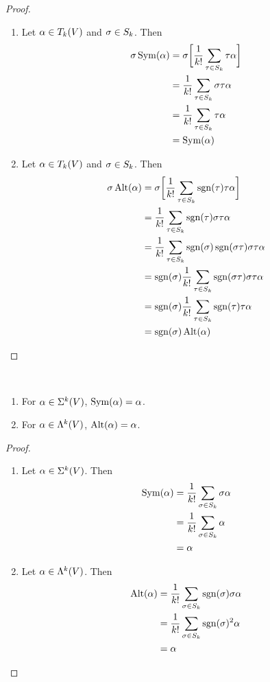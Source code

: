 \documentclass{book}
\begin{document}
	\begin{proof}\
		\begin{enumerate}
			\item Let $\alpha \in T_k(V)$ and $\sigma \in S_k$. Then 
			\begin{align*}
				\sigma \operatorname{Sym}(\alpha) 
				&= \sigma \bigg[ \frac{1}{k!}\sum_{\tau \in S_k} \tau \alpha \bigg]\\
				&= \frac{1}{k!} \sum_{\tau \in S_k} \sigma \tau \alpha \\
				&= \frac{1}{k!} \sum_{\tau \in S_k} \tau \alpha \\
				&= \operatorname{Sym}(\alpha)
			\end{align*} 
			\item Let $\alpha \in T_k(V)$ and $\sigma \in S_k$. Then 
			\begin{align*}
				\sigma \operatorname{Alt}(\alpha) 
				&= \sigma \bigg[ \frac{1}{k!}\sum_{\tau \in S_k} \operatorname{sgn}(\tau)\tau \alpha \bigg] \\
				&= \frac{1}{k!}\sum_{\tau \in S_k} \operatorname{sgn}(\tau) \sigma \tau \alpha \\
				&= \frac{1}{k!} \sum_{\tau \in S_k} \operatorname{sgn}(\sigma) \operatorname{sgn}(\sigma \tau) \sigma \tau \alpha \\
				&= \operatorname{sgn}(\sigma) \frac{1}{k!} \sum_{\tau \in S_k} \operatorname{sgn}(\sigma \tau) \sigma \tau \alpha \\
				&= \operatorname{sgn}(\sigma) \frac{1}{k!} \sum_{\tau \in S_k} \operatorname{sgn}(\tau)\tau \alpha \\
				&= \operatorname{sgn}(\sigma)\operatorname{Alt}(\alpha)
			\end{align*} 
		\end{enumerate}
	\end{proof}

	\begin{ex} \
		\begin{enumerate}
			\item For $\alpha \in \Sigma^k(V)$, $\operatorname{Sym}(\alpha) = \alpha$.
			\item For $\alpha \in \Lambda^k(V)$, $\operatorname{Alt}(\alpha) = \alpha$.
		\end{enumerate}
	\end{ex}

	\begin{proof}\
		\begin{enumerate}
			\item Let $\alpha \in \Sigma^k(V)$. Then 
			\begin{align*}
				\operatorname{Sym}(\alpha) 
				&= \frac{1}{k!} \sum_{\sigma \in S_k} \sigma \alpha \\
				&= \frac{1}{k!} \sum_{\sigma \in S_k} \alpha \\
				&= \alpha
			\end{align*}
			\item Let $\alpha \in \Lambda^k(V)$. Then 
			\begin{align*}
				\operatorname{Alt}(\alpha) 
				&= \frac{1}{k!} \sum_{\sigma \in S_k} \operatorname{sgn}(\sigma)\sigma \alpha \\
				&= \frac{1}{k!} \sum_{\sigma \in S_k} \operatorname{sgn}(\sigma)^2 \alpha \\
				&= \alpha
			\end{align*}
		\end{enumerate}
	\end{proof}
\end{document}
